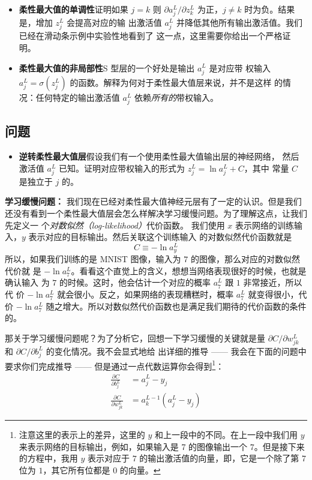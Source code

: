 \begin{itemize}
\item \textbf{柔性最大值的单调性}\quad 证明如果 $j=k$ 则 $\partial a^L_j
  / \partial z^L_k$ 为正，$j \neq k$ 时为负。结果是，增加 $z^L_j$ 会提高对应的输
  出激活值 $a^L_j$ 并降低其他所有输出激活值。我们已经在滑动条示例中实验性地看到了
  这一点，这里需要你给出一个严格证明。
\item \textbf{柔性最大值的非局部性}\quad S 型层的一个好处是输出 $a^L_j$ 是对应带
  权输入 $a^L_j = \sigma(z^L_j)$ 的函数。解释为何对于柔性最大值层来说，并不是这样
  的情况：任何特定的输出激活值 $a^L_j$ 依赖\emph{所有的}带权输入。
\end{itemize}

\subsection*{问题}

\begin{itemize}
\item \textbf{逆转柔性最大值层}\quad 假设我们有一个使用柔性最大值输出层的神经网络，
  然后激活值 $a^L_j$ 已知。证明对应带权输入的形式为 $z^L_j = \ln a^L_j + C$，其中
  常量 $C$ 是独立于 $j$ 的。
\end{itemize}

\textbf{学习缓慢问题：} 我们现在已经对柔性最大值神经元层有了一定的认识。但是我们
还没有看到一个柔性最大值层会怎么样解决学习缓慢问题。为了理解这点，让我们先定义一
个\emph{对数似然（log-likelihood）}代价函数。
我们使用 $x$ 表示网络的训练输入，$y$ 表示对应的目标输出。然后关联这个训练输入
的对数似然代价函数就是
\begin{equation}
  C \equiv -\ln a^L_y
  \label{eq:80}\tag{80}
\end{equation}
所以，如果我们训练的是 MNIST 图像，输入为 $7$ 的图像，那么对应的对数似然代价就
是 $-\ln a_7^L$。看看这个直觉上的含义，想想当网络表现很好的时候，也就是确认输入
为 $7$ 的时候。这时，他会估计一个对应的概率 $a_7^L$ 跟 $1$ 非常接近，所以代
价 $-\ln a_7^L$ 就会很小。反之，如果网络的表现糟糕时，概率 $a_7^L$ 就变得很小，代
价 $-\ln a_7^L$ 随之增大。所以对数似然代价函数也是满足我们期待的代价函数的条件
的。

那关于学习缓慢问题呢？为了分析它，回想一下学习缓慢的关键就是量 $\partial C
/ \partial w^L_{jk}$ 和 $\partial C / \partial b^L_j$ 的变化情况。我不会显式地给
出详细的推导 —— 我会在下面的问题中要求你们完成推导 —— 但是通过一点代数运算你会得到\footnote{
  注意这里的表示上的差异，这里的 $y$ 和上一段中的不同。在上一段中我们用 $y$ 来表示网络的目标输出，例如，如果输入是 7 的图像输出一个 $7$。但是接下来的方程中，我用 $y$ 表示对应于 $7$ 的输出激活值的向量，即，它是一个除了第 7 位为 $1$，其它所有位都是 $0$ 的向量。}：
\begin{align}
  \frac{\partial C}{\partial b^L_j} &= a^L_j-y_j \label{eq:81}\tag{81}\\
  \frac{\partial C}{\partial w^L_{jk}} &= a^{L-1}_k (a^L_j-y_j) \label{eq:82}\tag{82}
\end{align}

